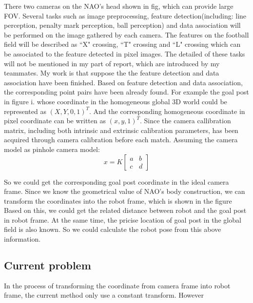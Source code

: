 There two cameras on the NAO's head shown in fig, which can provide large FOV. Several tasks such as image preprocessing, feature detection(including: line perception, penalty mark perception, ball perception) and data association will be performed on the image gathered by each camera. The features on the football field will be described as ``X" crossing, ``T" crossing and ``L" crossing which can be associated to the feature detected in pixel images. The detailed of these tasks will not be mentioned in my part of report, which are introduced by my teammates. My work is that suppose the the feature detection and data association have been finished.
Based on feature detection and data association, the corresponding point pairs have been already found. For example the goal post in figure i. whose coordinate in the homogeneous global 3D world could be represented as $(X,Y,0,1)^T$. And the corresponding homogeneous coordinate in pixel coordinate can be written as $(x,y,1)^T$. Since the camera callibration matrix, including both intrinsic and extrinsic calibration parameters, has been acquired through camera calibration %
 before each match. Assuming the camera model as pinhole camera model: %
\[ %
x = K 
\begin{bmatrix}
a & b \\
c & d 
\end{bmatrix}
\]

So we could get the corresponding goal post coordinate in the ideal camera frame. Since we know the geometrical value of NAO's body construction, we can transform the coordinates into the robot frame, which is shown in the figure %
Based on this, we could get the related distance between robot and the goal post in robot frame. At the same time, the pricise location of goal post in the global field is also known. So we could calculate the robot pose from this above information. %

\subsection{Current problem}
In the process of transforming the coordinate from camera frame into robot frame, the current method only use a constant transform. However
